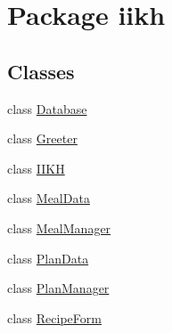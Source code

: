 \hypertarget{namespaceiikh}{\section{Package iikh}
\label{namespaceiikh}
}
\subsection*{Classes}
\begin{DoxyCompactItemize}
\item 
class \hyperlink{classiikh_1_1Database}{Database}
\item 
class \hyperlink{classiikh_1_1Greeter}{Greeter}
\item 
class \hyperlink{classiikh_1_1IIKH}{I\-I\-K\-H}
\item 
class \hyperlink{classiikh_1_1MealData}{Meal\-Data}
\item 
class \hyperlink{classiikh_1_1MealManager}{Meal\-Manager}
\item 
class \hyperlink{classiikh_1_1PlanData}{Plan\-Data}
\item 
class \hyperlink{classiikh_1_1PlanManager}{Plan\-Manager}
\item 
class \hyperlink{classiikh_1_1RecipeForm}{Recipe\-Form}
\end{DoxyCompactItemize}
